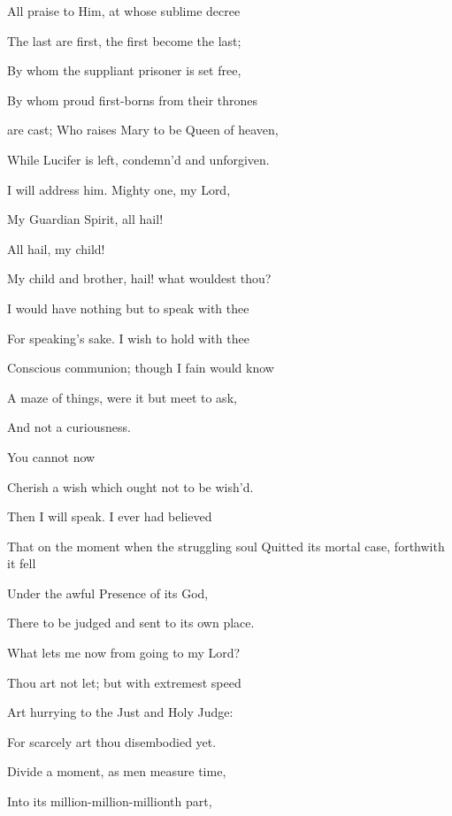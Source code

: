 All praise to Him, at whose sublime decree

The last are first, the first
become the last;

By whom the suppliant prisoner is set free,

By whom proud first-borns from
their thrones

are cast; Who raises Mary to be Queen of heaven,

While Lucifer is left, condemn'd and unforgiven.


I will address him. Mighty one, my Lord,

My Guardian Spirit, all hail!


All hail, my child!

My child and brother, hail! what wouldest thou?


I would have nothing but to speak with thee

For speaking's sake. I wish to hold with thee

Conscious communion; though I fain would know

A maze of things, were it but meet to ask,

And not a curiousness.


You cannot now

Cherish a wish which ought not to be wish'd.


Then I will speak. I ever had believed

That on the moment when the struggling soul Quitted its mortal case, forthwith it fell

Under the awful Presence of its God,

There to be judged and sent to its own place.

What lets me now from going to my Lord?


Thou art not let; but with extremest speed

Art hurrying to the Just and Holy Judge:

For scarcely art thou disembodied yet.

Divide a moment, as men measure time,

Into its million-million-millionth part,

